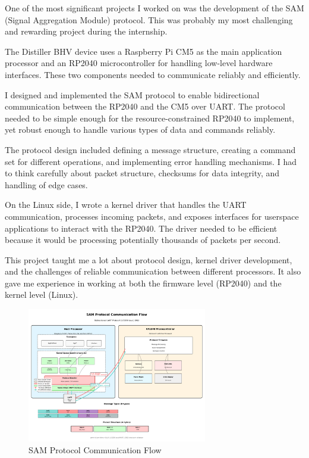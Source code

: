 \documentclass[12pt,a4paper]{report}
\begin{document}
One of the most significant projects I worked on was the development of the SAM (Signal Aggregation Module) protocol. This was probably my most challenging and rewarding project during the internship.

\vspace{0.3cm}

The Distiller BHV device uses a Raspberry Pi CM5 as the main application processor and an RP2040 microcontroller for handling low-level hardware interfaces. These two components needed to communicate reliably and efficiently.

\vspace{0.3cm}

I designed and implemented the SAM protocol to enable bidirectional communication between the RP2040 and the CM5 over UART. The protocol needed to be simple enough for the resource-constrained RP2040 to implement, yet robust enough to handle various types of data and commands reliably.

\vspace{0.3cm}

The protocol design included defining a message structure, creating a command set for different operations, and implementing error handling mechanisms. I had to think carefully about packet structure, checksums for data integrity, and handling of edge cases.

\vspace{0.3cm}

On the Linux side, I wrote a kernel driver that handles the UART communication, processes incoming packets, and exposes interfaces for userspace applications to interact with the RP2040. The driver needed to be efficient because it would be processing potentially thousands of packets per second.

\vspace{0.3cm}

This project taught me a lot about protocol design, kernel driver development, and the challenges of reliable communication between different processors. It also gave me experience in working at both the firmware level (RP2040) and the kernel level (Linux).

\begin{figure}[h]
    \centering
    \includegraphics[width=0.7\textwidth]{sam-protocol-flow.png}
    \caption{SAM Protocol Communication Flow}
\end{figure}
\end{document}
